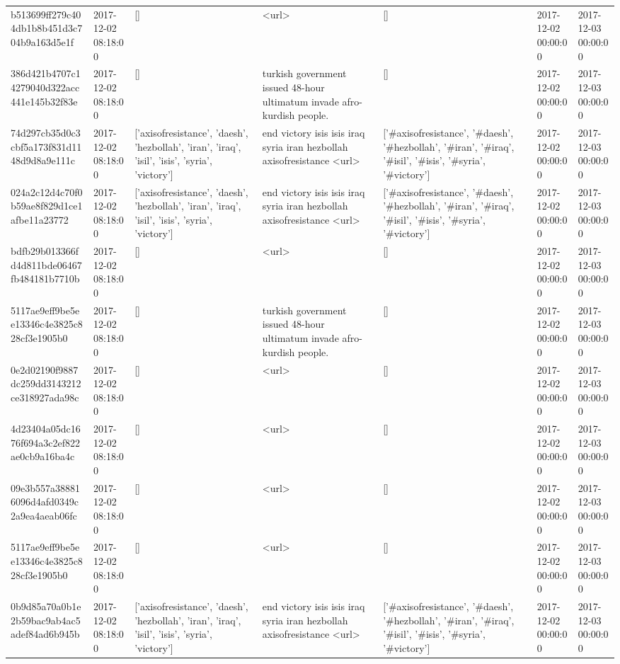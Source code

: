 \begin{tabular}{lllllll}
b513699ff279c404db1b8b451d3c704b9a163d5e1f & 2017-12-02 08:18:00 & [] & <url> & [] & 2017-12-02 00:00:00 & 2017-12-03 00:00:00 \\
386d421b4707c14279040d322acc441e145b32f83e & 2017-12-02 08:18:00 & [] & turkish government issued 48-hour ultimatum invade afro-kurdish people. & [] & 2017-12-02 00:00:00 & 2017-12-03 00:00:00 \\
74d297cb35d0c3cbf5a173f831d1148d9d8a9e111c & 2017-12-02 08:18:00 & ['axisofresistance', 'daesh', 'hezbollah', 'iran', 'iraq', 'isil', 'isis', 'syria', 'victory'] & end victory isis isis iraq syria iran hezbollah axisofresistance <url> & ['#axisofresistance', '#daesh', '#hezbollah', '#iran', '#iraq', '#isil', '#isis', '#syria', '#victory'] & 2017-12-02 00:00:00 & 2017-12-03 00:00:00 \\
024a2c12d4c70f0b59ae8f829d1ce1afbe11a23772 & 2017-12-02 08:18:00 & ['axisofresistance', 'daesh', 'hezbollah', 'iran', 'iraq', 'isil', 'isis', 'syria', 'victory'] & end victory isis isis iraq syria iran hezbollah axisofresistance <url> & ['#axisofresistance', '#daesh', '#hezbollah', '#iran', '#iraq', '#isil', '#isis', '#syria', '#victory'] & 2017-12-02 00:00:00 & 2017-12-03 00:00:00 \\
bdfb29b013366fd4d811bde06467fb484181b7710b & 2017-12-02 08:18:00 & [] & <url> & [] & 2017-12-02 00:00:00 & 2017-12-03 00:00:00 \\
5117ae9eff9be5ee13346c4e3825c828cf3e1905b0 & 2017-12-02 08:18:00 & [] & turkish government issued 48-hour ultimatum invade afro-kurdish people. & [] & 2017-12-02 00:00:00 & 2017-12-03 00:00:00 \\
0e2d02190f9887dc259dd3143212ce318927ada98c & 2017-12-02 08:18:00 & [] & <url> & [] & 2017-12-02 00:00:00 & 2017-12-03 00:00:00 \\
4d23404a05dc1676f694a3c2ef822ae0cb9a16ba4c & 2017-12-02 08:18:00 & [] & <url> & [] & 2017-12-02 00:00:00 & 2017-12-03 00:00:00 \\
09e3b557a388816096d4afd0349c2a9ea4aeab06fc & 2017-12-02 08:18:00 & [] & <url> & [] & 2017-12-02 00:00:00 & 2017-12-03 00:00:00 \\
5117ae9eff9be5ee13346c4e3825c828cf3e1905b0 & 2017-12-02 08:18:00 & [] & <url> & [] & 2017-12-02 00:00:00 & 2017-12-03 00:00:00 \\
0b9d85a70a0b1e2b59bac9ab4ac5adef84ad6b945b & 2017-12-02 08:18:00 & ['axisofresistance', 'daesh', 'hezbollah', 'iran', 'iraq', 'isil', 'isis', 'syria', 'victory'] & end victory isis isis iraq syria iran hezbollah axisofresistance <url> & ['#axisofresistance', '#daesh', '#hezbollah', '#iran', '#iraq', '#isil', '#isis', '#syria', '#victory'] & 2017-12-02 00:00:00 & 2017-12-03 00:00:00 \\

\end{tabular}
